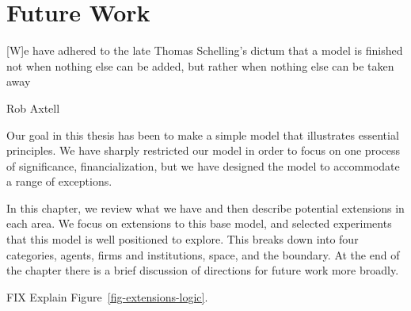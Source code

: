 \chapter[Future Work]{Future Work} \label{appendix-future-work}

\epigraph{[W]e have adhered to the late Thomas Schelling’s dictum that a model is finished not when nothing else can be added, but rather when nothing else can be taken away}{Rob Axtell \cite{axtellDynamicsFirmsData2024}}


Our goal in this thesis has been to make a simple model that illustrates essential principles. %
We have sharply restricted our model  in order to focus on one process of significance, financialization, but we have designed the model to accommodate a range of exceptions.  

In this chapter, we review what we have and then describe potential extensions in each area. We focus on extensions to this base model, and selected experiments that this model is well positioned to explore.  This breaks down into four categories, agents, firms and institutions, space, and the boundary. At the end of the chapter there is a brief discussion of directions for future work more broadly.

FIX Explain Figure~\ref{fig-extensions-logic}. %







